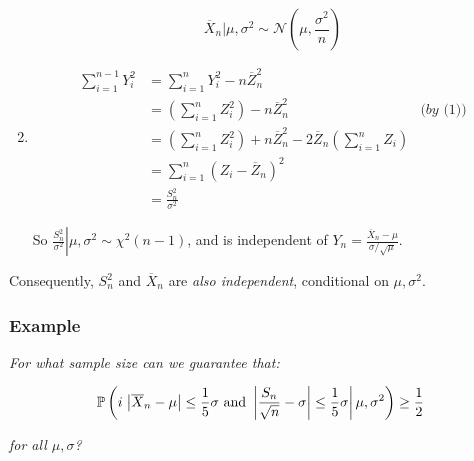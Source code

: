 \documentclass[a4paper]{article}
\begin{document}
\begin{enumerate}
                            \[
                                \overline X_n | \mu, \sigma^2 \sim
                                \mathcal{N}\left(\mu, \frac{\sigma^2}{n}\right)
                            \]

                        \item
                            \begin{align*}
                                \sum_{i=1}^{n-1} Y_i^2 & = \sum_{i=1}^n Y_i^2 -
                                    n \overline Z_n^2 \\
                                & = \left(\sum_{i=1}^n Z_i^2\right) - n\overline
                                    Z_n^2 & \textit{(by (1))} \\
                                & = \left(\sum_{i=1}^n Z_i^2\right) + n\overline
                                    Z_n^2 - 2\overline Z_n \left(\sum_{i=1}^n
                                    Z_i\right) \\
                                & = \sum_{i=1}^n \left(Z_i - \overline Z_n
                                    \right)^2 \\
                                & = \frac{S_n^2}{\sigma^2}
                            \end{align*}

                            So $\left.\frac{S_n^2}{\sigma^2}\right| \mu,
                            \sigma^2 \sim \chi^2(n - 1)$, and is independent of
                            $Y_n = \frac{\overline X_n - \mu}{\sigma /
                            \sqrt{\mu}}$.
                    \end{enumerate}

                    Consequently, $S_n^2$ and $\overline X_n$ are \textit{also
                    independent}, conditional on $\mu, \sigma^2$.

            \subsubsection{Example}
                \textit{For what sample size can we guarantee that:}

                \[
                    \mathbb{P}\left(i\left.\left|\overline X_n - \mu\right| \leq
                    \frac{1}{5}\sigma \text{ and } \left|\frac{S_n}{\sqrt{n}} -
                    \sigma\right| \leq \frac{1}{5}\sigma\right|\mu, \sigma^2
                    \right) \geq \frac{1}{2}
                \]

                \textit{for all $\mu, \sigma$?}
\end{document}

